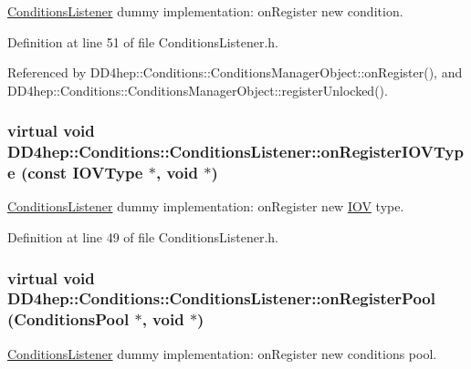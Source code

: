 \hyperlink{class_d_d4hep_1_1_conditions_1_1_conditions_listener}{ConditionsListener} dummy implementation: onRegister new condition. 

Definition at line 51 of file ConditionsListener.h.

Referenced by DD4hep::Conditions::ConditionsManagerObject::onRegister(), and DD4hep::Conditions::ConditionsManagerObject::registerUnlocked().\hypertarget{class_d_d4hep_1_1_conditions_1_1_conditions_listener_a8757616579713cf0101d5c6b68460f9d}{
\subsubsection[{onRegisterIOVType}]{\setlength{\rightskip}{0pt plus 5cm}virtual void DD4hep::Conditions::ConditionsListener::onRegisterIOVType (const {\bf IOVType} $\ast$, \/  void $\ast$)}}
\label{class_d_d4hep_1_1_conditions_1_1_conditions_listener_a8757616579713cf0101d5c6b68460f9d}


\hyperlink{class_d_d4hep_1_1_conditions_1_1_conditions_listener}{ConditionsListener} dummy implementation: onRegister new \hyperlink{class_d_d4hep_1_1_i_o_v}{IOV} type. 

Definition at line 49 of file ConditionsListener.h.\hypertarget{class_d_d4hep_1_1_conditions_1_1_conditions_listener_a161a768eb8f00b3272d85f95ec14fa86}{
\subsubsection[{onRegisterPool}]{\setlength{\rightskip}{0pt plus 5cm}virtual void DD4hep::Conditions::ConditionsListener::onRegisterPool ({\bf ConditionsPool} $\ast$, \/  void $\ast$)}}
\label{class_d_d4hep_1_1_conditions_1_1_conditions_listener_a161a768eb8f00b3272d85f95ec14fa86}


\hyperlink{class_d_d4hep_1_1_conditions_1_1_conditions_listener}{ConditionsListener} dummy implementation: onRegister new conditions pool. 

